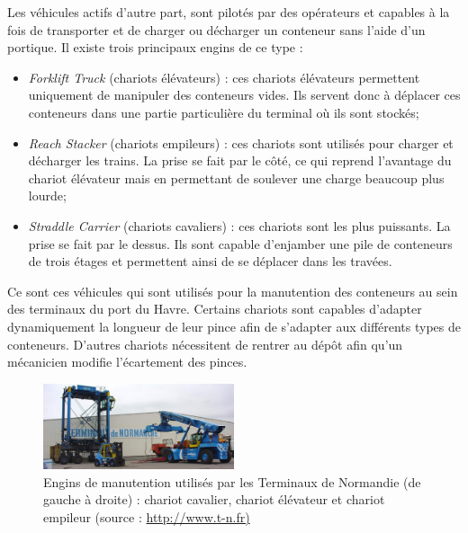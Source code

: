 Les véhicules actifs d'autre part, sont pilotés par des opérateurs et capables à la fois de transporter et de charger ou décharger un conteneur sans l'aide d'un portique. Il existe trois principaux engins de ce type : 
\begin{itemize}
 \item \textit{Forklift Truck} (chariots élévateurs) : ces chariots élévateurs permettent uniquement de manipuler des conteneurs vides. Ils servent donc à déplacer ces conteneurs dans une partie particulière du terminal où ils sont stockés;
 \item \textit{Reach Stacker }(chariots empileurs) : ces chariots sont utilisés pour charger et décharger les trains. La prise se fait par le côté, ce qui reprend l'avantage du chariot élévateur mais en permettant de soulever une charge beaucoup plus lourde;
 \item \textit{Straddle Carrier} (chariots cavaliers) : ces chariots sont les plus puissants. La prise se fait par le dessus. Ils sont capable d'enjamber une pile de conteneurs de trois étages et permettent ainsi de se déplacer dans les travées.
\end{itemize}

Ce sont ces véhicules qui sont utilisés pour la manutention des conteneurs au sein des terminaux du port du Havre. Certains chariots sont capables d'adapter dynamiquement la longueur de leur pince afin de s'adapter aux différents types de conteneurs. D'autres chariots nécessitent de rentrer au dépôt afin qu'un mécanicien modifie l'écartement des pinces.
\begin{figure}[ht]
 \label{fig:enginsManutention}
 \begin{center}
 \includegraphics[width=0.5\textwidth]{chapitres/application/enginsTN.png}
 \caption{Engins de manutention utilisés par les Terminaux de Normandie (de gauche à droite) : chariot cavalier, chariot élévateur et chariot empileur (source : \url{http://www.t-n.fr)}}
 \end{center}
\end{figure}

